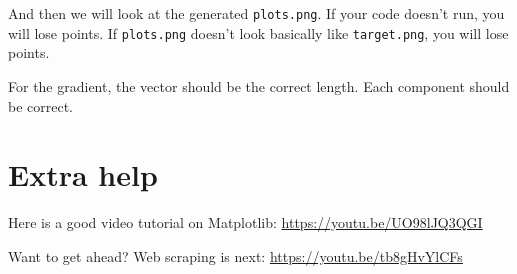 \documentclass[11pt,english]{article}
\begin{document}
And then we will look at the generated \texttt{plots.png}.  If your code doesn't run, you will lose points.  If \texttt{plots.png} doesn't look basically like \texttt{target.png}, you will lose points.

For the gradient,  the vector should be the correct length.  Each component should be correct.

\section{Extra help}

Here is a good video tutorial on Matplotlib:
\url{https://youtu.be/UO98lJQ3QGI}

Want to get ahead?  Web scraping is next:
\url{https://youtu.be/tb8gHvYlCFs}
\end{document}
